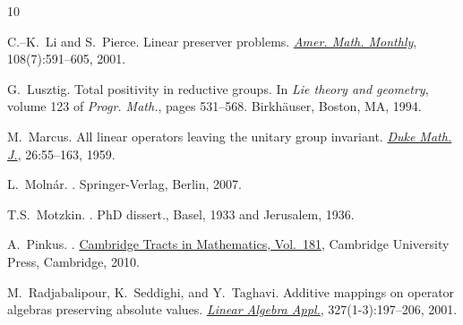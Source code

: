 \documentclass[11pt,reqno]{amsart}
\theoremstyle{plain}
\theoremstyle{definition}
\numberwithin{equation}{section}
\begin{document}
\begin{thebibliography}{10}
		
		C.--K.~Li and S.~Pierce.
		\newblock Linear preserver problems.
		\newblock \href{https://www.tandfonline.com/doi/abs/10.1080/00029890.2001.11919790}{\em Amer. Math. Monthly}, 108(7):591--605, 2001.
		
		
		G.~Lusztig.
		\newblock Total positivity in reductive groups.
		\newblock In {\em Lie theory and geometry}, volume 123 of {\em Progr. Math.}, pages 531--568. Birkh\"{a}user, Boston, MA, 1994.
		
		M.~Marcus.
		\newblock All linear operators leaving the unitary group invariant.
		\newblock \href{https://projecteuclid.org/journals/duke-mathematical-journal/volume-26/issue-1/All-linear-operators-leaving-the-unitary-group-invariant/10.1215/S0012-7094-59-02615-8.short}
		{\em Duke Math. J.}, 26:55--163, 1959.
		
		L.~Moln\'{a}r.
		.
		\newblock Springer-Verlag, Berlin, 2007.
		
		T.S.~Motzkin.
		.
		\newblock PhD dissert., Basel, 1933 and Jerusalem, 1936.
		
		
		
		A.~Pinkus.
		.
		\newblock \href{http://dx.doi.org/10.1017/CBO9780511691713}{Cambridge Tracts in Mathematics, Vol.~181}, Cambridge University Press, Cambridge, 2010.		
		
		M.~Radjabalipour, K.~Seddighi, and Y.~Taghavi.
		\newblock Additive mappings on operator algebras preserving absolute values.
		\newblock \href{https://www.sciencedirect.com/science/article/pii/S0024379500003384}
		{\em Linear Algebra Appl.}, 327(1-3):197--206, 2001.
		

\end{thebibliography}
\end{document}
